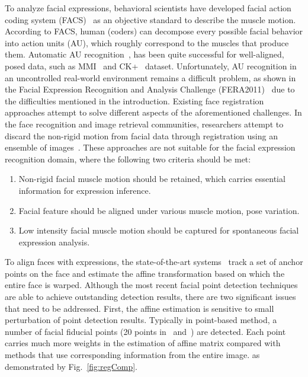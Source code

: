 \documentclass[10pt,journal]{IEEEtran}
\begin{document}
To analyze facial expressions, behavioral scientists have developed facial action coding system (FACS)~\cite{Ekman78} as an objective standard to describe the muscle motion. According to FACS, human (coders) can decompose every possible facial behavior into action units (AU), which roughly correspond to the muscles that produce them. Automatic AU recognition~\cite{Zhao_PAMI07}\cite{Valstar_SMCB12}, has been quite successful for well-aligned, posed data, such as MMI~\cite{Pantic_ICME05} and CK+~\cite{Kanade_FG00} dataset. Unfortunately, AU recognition in an uncontrolled real-world environment remains a difficult problem, as shown in the Facial Expression Recognition and Analysis Challenge (FERA2011)~\cite{Valstar_FERA11} due to the difficulties mentioned in the introduction. Existing face registration approaches attempt to solve different aspects of the aforementioned challenges. In the face recognition and image retrieval communities, researchers attempt to discard the non-rigid motion from facial data through registration using an ensemble of images~\cite{LearnedMiller_PAMI06}\cite{Huang_ICCV07}\cite{Peng_CVPR10}. These approaches are not suitable for the facial expression recognition domain, where the following two criteria should be met:
\begin{enumerate}
\item Non-rigid facial muscle motion should be retained, which carries essential information for expression inference. 
\item Facial feature should be aligned under various muscle motion, pose variation. 
\item Low intensity facial muscle motion should be captured for spontaneous facial expression analysis.
\end{enumerate}

To align faces with expressions, the state-of-the-art systems~\cite{Valstar_SMCB12}\cite{Littlewort_CERT_FG2011} track a set of anchor points on the face and estimate the affine transformation based on which the entire face is warped. Although the most recent facial point detection techniques~\cite{Martinez_PAMI13}\cite{Xiong13}\cite{Zhu_CVPR12} are able to achieve outstanding detection results, there are two significant issues that need to be addressed. First, the affine estimation is sensitive to small perturbation of point detection results. Typically in point-based method, a number of facial fiducial points (20 points in~\cite{Valstar_SMCB12} and~\cite{Martinez_PAMI13}) are detected. Each point carries much more weights in the estimation of affine matrix compared with methods that use corresponding information from the entire image. as demonstrated by Fig.~\ref{fig:regComp}.
\end{document}
